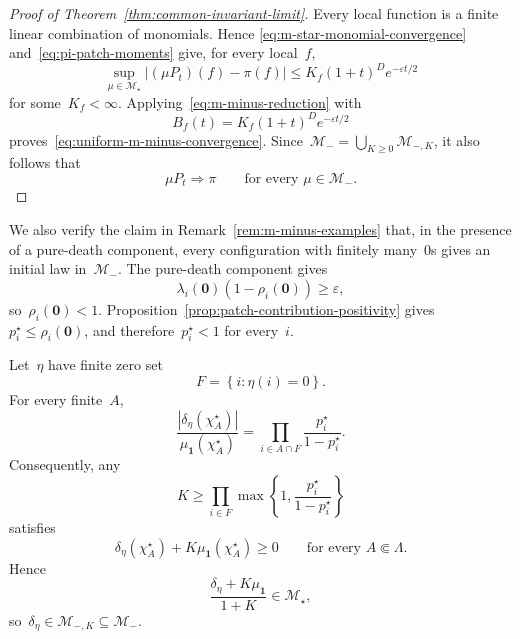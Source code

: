 \documentclass[EJP,preprint,NODS,nobera]{ejpecp}
\newcommand{\bb}[1]{\left(#1\right)}
\newcommand{\cb}[1]{\left\{#1\right\}}
\newcommand{\abs}[1]{\left|#1\right|}
\newcommand{\mb}[1]{\mathbf{#1}}
\begin{document}
\begin{proof}[Proof of Theorem~\ref{thm:common-invariant-limit}]
Every local function is a finite linear combination of monomials. Hence
\eqref{eq:m-star-monomial-convergence} and~\eqref{eq:pi-patch-moments} give,
for every local~$f$,
\begin{equation}
\label{eq:m-star-local-convergence}
\sup_{\mu\in\mathcal M_\star}
\abs{(\mu P_t)(f)-\pi(f)}
\leq
K_f(1+t)^D e^{-\varepsilon t/2}
\end{equation}
for some~$K_f<\infty$. Applying~\eqref{eq:m-minus-reduction} with
\begin{equation*}
B_f(t)
=
K_f(1+t)^D e^{-\varepsilon t/2}
\end{equation*}
proves~\eqref{eq:uniform-m-minus-convergence}. Since~$\mathcal M_- = \bigcup_{K\geq0}\mathcal M_{-,K}$, it also follows that
\begin{equation*}
\mu P_t\Rightarrow\pi
\qquad
\text{for every }\mu\in\mathcal M_-.
\end{equation*}
\end{proof}

We also verify the claim in Remark~\ref{rem:m-minus-examples}
that, in the presence of a pure-death component, every configuration with finitely many~$0$s gives an initial law in~$\mathcal M_-$. The pure-death component gives
\begin{equation*}
\lambda_i(\mb 0)\bb{1-\rho_i(\mb 0)}
\geq
\varepsilon,
\end{equation*}
so~$\rho_i(\mb 0)<1$. Proposition~\ref{prop:patch-contribution-positivity}
gives~$p_i^\star\leq\rho_i(\mb 0)$, and therefore~$p_i^\star<1$ for every~$i$.

Let~$\eta$ have finite zero set
\begin{equation*}
F
=
\cb{i:\eta(i)=0}.
\end{equation*}
For every finite~$A$,
\begin{equation*}
\frac{
\abs{\delta_\eta(\chi_A^\star)}
}{
\mu_{\mb 1}(\chi_A^\star)
}
=
\prod_{i\in A\cap F}
\frac{p_i^\star}{1-p_i^\star}.
\end{equation*}
Consequently, any
\begin{equation*}
K
\geq
\prod_{i\in F}
\max\cb{
1,
\frac{p_i^\star}{1-p_i^\star}
}
\end{equation*}
satisfies
\begin{equation*}
\delta_\eta(\chi_A^\star)
+
K\mu_{\mb 1}(\chi_A^\star)
\geq0
\qquad
\text{for every }A\Subset\Lambda.
\end{equation*}
Hence
\begin{equation*}
\frac{\delta_\eta+K\mu_{\mb 1}}{1+K}
\in
\mathcal M_\star,
\end{equation*}
so~$\delta_\eta\in\mathcal M_{-,K}\subseteq\mathcal M_-$.
\end{document}
